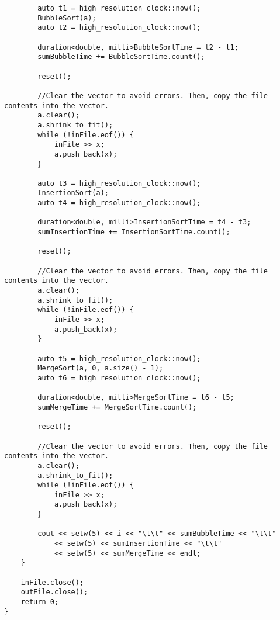 \documentclass[a4paper, 12pt]{article}
\begin{document}
\begin{lstlisting}
		auto t1 = high_resolution_clock::now();
		BubbleSort(a);
		auto t2 = high_resolution_clock::now();

		duration<double, milli>BubbleSortTime = t2 - t1;
		sumBubbleTime += BubbleSortTime.count();

		reset();

		//Clear the vector to avoid errors. Then, copy the file contents into the vector. 
		a.clear();
		a.shrink_to_fit();
		while (!inFile.eof()) {
			inFile >> x;
			a.push_back(x);
		}

		auto t3 = high_resolution_clock::now();
		InsertionSort(a);
		auto t4 = high_resolution_clock::now();

		duration<double, milli>InsertionSortTime = t4 - t3;
		sumInsertionTime += InsertionSortTime.count();

		reset();

		//Clear the vector to avoid errors. Then, copy the file contents into the vector. 
		a.clear();
		a.shrink_to_fit();
		while (!inFile.eof()) {
			inFile >> x;
			a.push_back(x);
		}

		auto t5 = high_resolution_clock::now();
		MergeSort(a, 0, a.size() - 1);
		auto t6 = high_resolution_clock::now();

		duration<double, milli>MergeSortTime = t6 - t5;
		sumMergeTime += MergeSortTime.count();

		reset();

		//Clear the vector to avoid errors. Then, copy the file contents into the vector. 
		a.clear();
		a.shrink_to_fit();
		while (!inFile.eof()) {
			inFile >> x;
			a.push_back(x);
		}

		cout << setw(5) << i << "\t\t" << sumBubbleTime << "\t\t"
			<< setw(5) << sumInsertionTime << "\t\t"
			<< setw(5) << sumMergeTime << endl;
	}

	inFile.close();
	outFile.close();
	return 0;
}
	\end{lstlisting}
	
\end{document}
